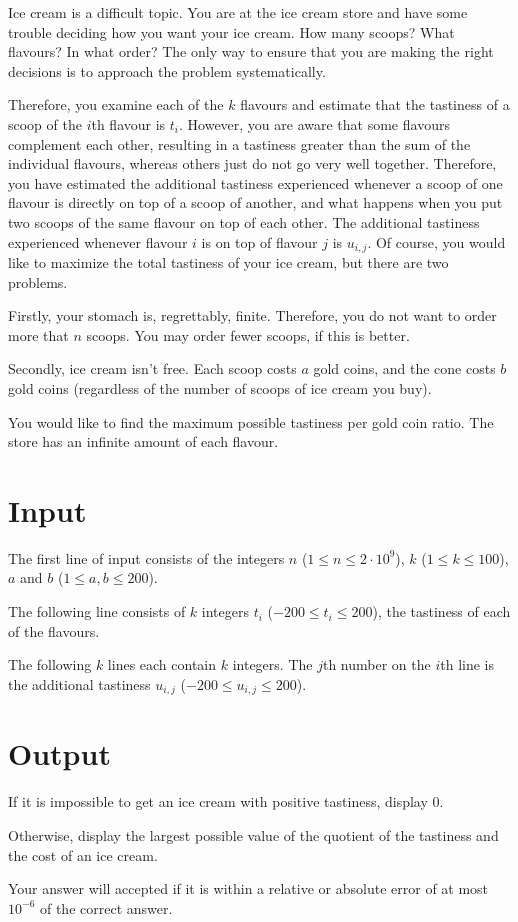 Ice cream is a difficult topic. You are at the ice cream store and have some trouble deciding how you want your ice cream. How many scoops? What flavours? In what order? The only way to ensure that you are making the right decisions is to approach the problem systematically.

Therefore, you examine each of the $k$ flavours and estimate that the tastiness of a scoop of the $i$th flavour is $t_i$. However, you are aware that some flavours complement each other, resulting in a tastiness greater than the sum of the individual flavours, whereas others just do not go very well together. Therefore, you have estimated the additional tastiness experienced whenever a scoop of one flavour is directly on top of a scoop of another, and what happens when you put two scoops of the same flavour on top of each other. The additional tastiness experienced whenever flavour $i$ is on top of flavour $j$ is $u_{i,j}$.
Of course, you would like to maximize the total tastiness of your ice cream, but there are two problems.

Firstly, your stomach is, regrettably, finite. Therefore, you do not want to order more that $n$ scoops.
You may order fewer scoops, if this is better.

Secondly, ice cream isn't free. Each scoop costs $a$ gold coins, and the cone costs $b$ gold coins (regardless of the number of scoops of ice cream you buy).

You would like to find the maximum possible tastiness per gold coin ratio. The store has an infinite amount of each flavour.

\section*{Input}
The first line of input consists of the integers $n$ ($1 \leq n \leq 2 \cdot 10^9$), $k$ ($1 \leq k \leq 100$), $a$ and $b$ ($1 \leq a,b \leq 200$).

The following line consists of $k$ integers $t_i$ ($-200 \leq t_i \leq 200$), the tastiness of each of the flavours.

The following $k$ lines each contain $k$ integers. The $j$th number on the $i$th line is the additional tastiness $u_{i,j}$ ($-200 \leq u_{i,j} \leq 200$).

\section*{Output}
If it is impossible to get an ice cream with positive tastiness, display $0$.

Otherwise, display the largest possible value of the quotient of the tastiness and the cost of an ice cream.

Your answer will accepted if it is within a relative or absolute error of at most $10^{-6}$ of the correct answer.
